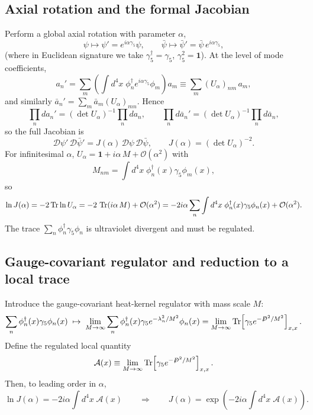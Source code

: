 \documentclass[11pt]{article}
\theoremstyle{remark}
\newcommand{\cO}{\mathcal{O}}
\begin{document}
\subsection{Axial rotation and the formal Jacobian}
Perform a global axial rotation with parameter $\alpha$,
\begin{equation}\label{eq:fuj-axial}
\psi \mapsto \psi' = e^{i\alpha\gamma_5}\psi,\qquad
\bar\psi \mapsto \bar\psi'=\bar\psi\,e^{i\alpha\gamma_5},
\end{equation}
(where in Euclidean signature we take $\gamma_5^\dagger=\gamma_5$, $\gamma_5^2=\mathbf{1}$).
At the level of mode coefficients,
\begin{equation}
a_n'=\sum_m \left(\int d^4x\;\phi_n^\dagger e^{i\alpha\gamma_5}\phi_m\right)a_m
\equiv \sum_m (U_\alpha)_{nm}\,a_m,
\end{equation}
and similarly $\bar a_n'=\sum_m \bar a_m (U_\alpha)_{mn}$.
Hence
\begin{equation}
\prod_n da_n' = (\det U_\alpha)^{-1}\prod_n da_n,\qquad
\prod_n d\bar a_n' = (\det U_\alpha)^{-1}\prod_n d\bar a_n,
\end{equation}
so the full Jacobian is
\begin{equation}\label{eq:fuj-Jformal}
\mathcal{D}\psi'\,\mathcal{D}\bar\psi' = J(\alpha)\,\mathcal{D}\psi\,\mathcal{D}\bar\psi,
\qquad
J(\alpha)=(\det U_\alpha)^{-2}.
\end{equation}
For infinitesimal $\alpha$, $U_\alpha = \mathbf{1}+ i\alpha\,M + \cO(\alpha^2)$ with
\begin{equation}
M_{nm}=\int d^4x\;\phi_n^\dagger(x)\gamma_5\phi_m(x),
\end{equation}
so
\begin{equation}\label{eq:fuj-Jinf}
\ln J(\alpha)= -2\Tr\ln U_\alpha
= -2\,\Tr\!\left(i\alpha\,M\right)+\cO(\alpha^2)
= -2i\alpha \sum_n \int d^4x\;\phi_n^\dagger(x)\gamma_5\phi_n(x)+\cO(\alpha^2).
\end{equation}
The trace $\sum_n \phi_n^\dagger\gamma_5\phi_n$ is ultraviolet divergent and must be regulated.

\subsection{Gauge-covariant regulator and reduction to a local trace}
Introduce the gauge-covariant heat-kernel regulator with mass scale $M$:
\begin{equation}\label{eq:fuj-reg}
\sum_n \phi_n^\dagger(x)\gamma_5\phi_n(x)
\;\mapsto\;
\lim_{M\to\infty}\sum_n \phi_n^\dagger(x)\gamma_5 e^{-\lambda_n^2/M^2}\phi_n(x)
=
\lim_{M\to\infty}\Tr\!\left[\gamma_5 e^{-\not{D}^2/M^2}\right]_{x,x}.
\end{equation}
Define the regulated local quantity
\begin{equation}\label{eq:fuj-Ax}
\mathcal{A}(x)\equiv \lim_{M\to\infty}\Tr\!\left[\gamma_5 e^{-\not{D}^2/M^2}\right]_{x,x}.
\end{equation}
Then, to leading order in $\alpha$,
\begin{equation}\label{eq:fuj-J-A}
\ln J(\alpha) = -2i\alpha \int d^4x\;\mathcal{A}(x)
\qquad\Rightarrow\qquad
J(\alpha)=\exp\!\left(-2i\alpha\int d^4x\;\mathcal{A}(x)\right).
\end{equation}
\end{document}
